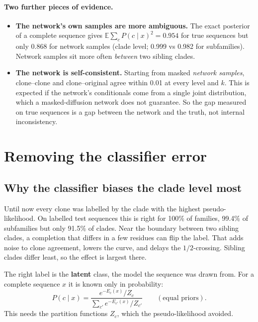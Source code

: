 \documentclass[11pt,a4paper]{article}
\newcommand{\E}{\mathbb{E}}
\begin{document}
\paragraph{Two further pieces of evidence.}
\begin{itemize}[nosep]
\item \textbf{The network's own samples are more ambiguous.} The exact posterior of a complete sequence gives
$\E\sum_cP(c\mid x)^2=0.954$ for true sequences but only 0.868 for network samples (clade level; 0.999 vs 0.982 for
subfamilies). Network samples sit more often \emph{between} two sibling clades.
\item \textbf{The network is self-consistent.} Starting from masked \emph{network samples}, clone--clone and
clone--original agree within 0.01 at every level and $k$. This is expected if the network's conditionals come from a
single joint distribution, which a masked-diffusion network does not guarantee. So the gap measured on true sequences is
a gap between the network and the truth, not internal inconsistency.
\end{itemize}

\section{Removing the classifier error}
\subsection{Why the classifier biases the clade level most}
Until now every clone was labelled by the clade with the highest pseudo-likelihood. On labelled test sequences this is
right for 100\% of families, 99.4\% of subfamilies but only 91.5\% of clades. Near the boundary between two sibling clades,
a completion that differs in a few residues can flip the label. That adds noise to clone agreement, lowers the curve,
and delays the $1/2$-crossing. Sibling clades differ least, so the effect is largest there.

The right label is the \textbf{latent} class, the model the sequence was drawn from. For a complete sequence $x$ it is
known only in probability:
\[
P(c\mid x)=\frac{e^{-E_c(x)}/Z_c}{\sum_{c'}e^{-E_{c'}(x)}/Z_{c'}}\qquad(\text{equal priors}).
\]
This needs the partition functions $Z_c$, which the pseudo-likelihood avoided.
\end{document}
